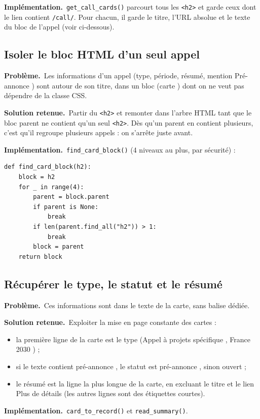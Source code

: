 \documentclass[11pt,a4paper]{article}
\newcommand{\pb}{\par\medskip\noindent\textbf{\textcolor{pbcolor}{Problème.}}\ }
\newcommand{\sol}{\par\medskip\noindent\textbf{\textcolor{solcolor}{Solution retenue.}}\ }
\newcommand{\impl}{\par\medskip\noindent\textbf{\textcolor{implcolor}{Implémentation.}}\ }
\newcommand{\code}[1]{\texttt{#1}}
\begin{document}
\impl \code{get\_call\_cards()} parcourt tous les \code{<h2>} et garde ceux dont le lien
contient \code{/call/}. Pour chacun, il garde le titre, l'URL absolue et le texte du bloc
de l'appel (voir ci-dessous).

\subsection{Isoler le bloc HTML d'un seul appel}

\pb Les informations d'un appel (type, période, résumé, mention \og Pré-annonce \fg) sont
autour de son titre, dans un bloc (\og carte \fg) dont on ne veut pas dépendre de la classe CSS.

\sol Partir du \code{<h2>} et remonter dans l'arbre HTML tant que le bloc parent ne contient
qu'un seul \code{<h2>}. Dès qu'un parent en contient plusieurs, c'est qu'il regroupe
plusieurs appels : on s'arrête juste avant.

\impl \code{find\_card\_block()} (4 niveaux au plus, par sécurité) :

\begin{lstlisting}
def find_card_block(h2):
    block = h2
    for _ in range(4):
        parent = block.parent
        if parent is None:
            break
        if len(parent.find_all("h2")) > 1:
            break
        block = parent
    return block
\end{lstlisting}

\subsection{Récupérer le type, le statut et le résumé}

\pb Ces informations sont dans le texte de la carte, sans balise dédiée.

\sol Exploiter la mise en page constante des cartes :
\begin{itemize}
  \item la première ligne de la carte est le type (\og Appel à projets spécifique \fg, \og France 2030 \fg) ;
  \item si le texte contient \og pré-annonce \fg, le statut est \og pré-annonce \fg, sinon \og ouvert \fg ;
  \item le résumé est la ligne la plus longue de la carte, en excluant le titre et le lien
        \og Plus de détails \fg{} (les autres lignes sont des étiquettes courtes).
\end{itemize}

\impl \code{card\_to\_record()} et \code{read\_summary()}.
\end{document}
